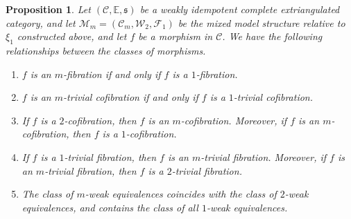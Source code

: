 \documentclass[11pt,a4paper]{amsart}
\numberwithin{equation}{section}
\theoremstyle{plain}
\newtheorem{prop}[thm]{Proposition}
\begin{document}
\begin{prop}
	Let $(\mathscr{C},\mathbb{E},\mathfrak{s})$ be a weakly idempotent complete extriangulated category, and let $\mathcal{M}_m=(\mathcal{C}_m,\mathcal{W}_2,\mathcal{F}_1)$ be the mixed model structure relative to $\xi_1$ constructed above, and let $f$ be a morphism in $\mathscr{C}$.
	We have the following relationships between the classes of morphisms.
	\begin{enumerate}
		\item
		$f$ is an $m$-fibration if and only if $f$ is a $1$-fibration.
		
		\item
		$f$ is an $m$-trivial cofibration if and only if $f$ is a $1$-trivial cofibration.
		
		\item
		If $f$ is a $2$-cofibration, then $f$ is an $m$-cofibration. Moreover, if $f$ is an $m$-cofibration, then $f$ is a $1$-cofibration.
		
		\item
		If $f$ is a $1$-trivial fibration, then $f$ is an $m$-trivial fibration. Moreover, if $f$ is an $m$-trivial fibration, then $f$ is a $2$-trivial fibration.
		
		\item
		The class of $m$-weak equivalences coincides with the class of $2$-weak equivalences, and contains the class of all $1$-weak equivalences.
	\end{enumerate}
\end{prop}
\end{document}

